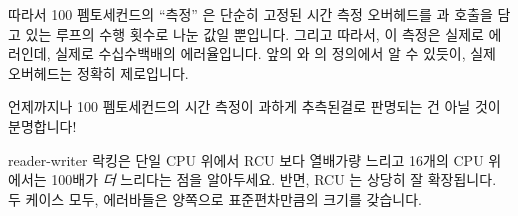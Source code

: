 {	따라서 100 펨토세컨드의 ``측정'' 은 단순히 고정된 시간 측정 오버헤드를
	 과  호출을 담고 있는 루프의
	수행 횟수로 나눈 값일 뿐입니다.
	그리고 따라서, 이 측정은 실제로 에러인데, 실제로 수십수백배의
	에러율입니다.
	앞의  와  의 정의에서 알 수
	있듯이, 실제 오버헤드는 정확히 제로입니다.

	언제까지나 100 펨토세컨드의 시간 측정이 과하게 추측된걸로 판명되는 건
	아닐 것이 분명합니다!

} \QuickQuizEnd

reader-writer 락킹은 단일 CPU 위에서 RCU 보다 열배가량 느리고 16개의 CPU
위에서는 100배가 \emph{더} 느리다는 점을 알아두세요.
반면, RCU 는 상당히 잘 확장됩니다.
두 케이스 모두, 에러바들은 양쪽으로 표준편차만큼의 크기를 갖습니다.

